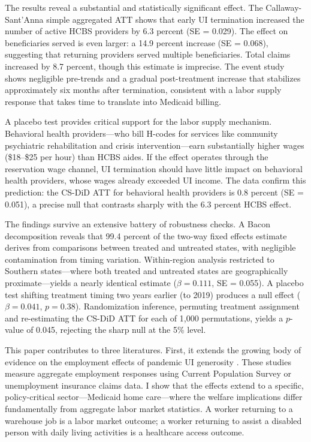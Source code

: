 \documentclass[12pt]{article}
\begin{document}
The results reveal a substantial and statistically significant effect. The Callaway-Sant'Anna simple aggregated ATT shows that early UI termination increased the number of active HCBS providers by 6.3 percent (SE = 0.029). The effect on beneficiaries served is even larger: a 14.9 percent increase (SE = 0.068), suggesting that returning providers served multiple beneficiaries. Total claims increased by 8.7 percent, though this estimate is imprecise. The event study shows negligible pre-trends and a gradual post-treatment increase that stabilizes approximately six months after termination, consistent with a labor supply response that takes time to translate into Medicaid billing.

A placebo test provides critical support for the labor supply mechanism. Behavioral health providers---who bill H-codes for services like community psychiatric rehabilitation and crisis intervention---earn substantially higher wages (\$18--\$25 per hour) than HCBS aides. If the effect operates through the reservation wage channel, UI termination should have little impact on behavioral health providers, whose wages already exceeded UI income. The data confirm this prediction: the CS-DiD ATT for behavioral health providers is 0.8 percent (SE = 0.051), a precise null that contrasts sharply with the 6.3 percent HCBS effect.

The findings survive an extensive battery of robustness checks. A Bacon decomposition reveals that 99.4 percent of the two-way fixed effects estimate derives from comparisons between treated and untreated states, with negligible contamination from timing variation. Within-region analysis restricted to Southern states---where both treated and untreated states are geographically proximate---yields a nearly identical estimate ($\beta = 0.111$, SE = 0.055). A placebo test shifting treatment timing two years earlier (to 2019) produces a null effect ($\beta = 0.041$, $p = 0.38$). Randomization inference, permuting treatment assignment and re-estimating the CS-DiD ATT for each of 1,000 permutations, yields a $p$-value of 0.045, rejecting the sharp null at the 5\% level.

This paper contributes to three literatures. First, it extends the growing body of evidence on the employment effects of pandemic UI generosity \citep{holzer2021, coombs2022, ganong2022, dube2021}. These studies measure aggregate employment responses using Current Population Survey or unemployment insurance claims data. I show that the effects extend to a specific, policy-critical sector---Medicaid home care---where the welfare implications differ fundamentally from aggregate labor market statistics. A worker returning to a warehouse job is a labor market outcome; a worker returning to assist a disabled person with daily living activities is a healthcare access outcome.
\end{document}
